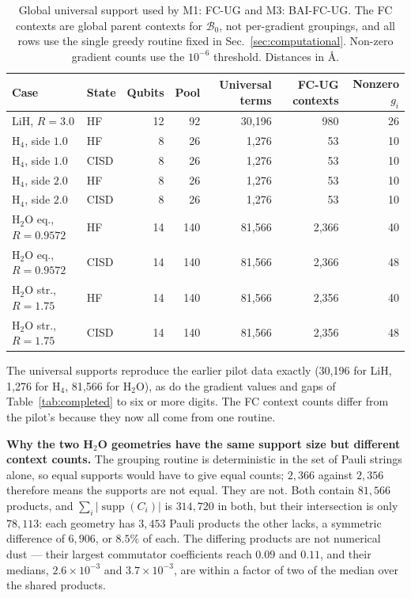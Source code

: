 \documentclass[10pt]{article}
\newcommand{\supp}{\operatorname{supp}}
\begin{document}
\begin{table}[!htbp]
\centering
\scriptsize
\caption{Global universal support used by M1: FC-UG and M3: BAI-FC-UG. The FC contexts are global parent contexts for $\mathcal B_0$, not per-gradient groupings, and all rows use the single greedy routine fixed in Sec.~\ref{sec:computational}. Non-zero gradient counts use the $10^{-6}$ threshold. Distances in \si{\angstrom}.}
\label{tab:structure}
\begin{tabular}{llrrrrr}
\toprule
Case & State & Qubits & Pool & Universal terms & FC-UG contexts & Nonzero $g_i$ \\
\midrule
LiH, $R{=}3.0$ & HF & 12 & 92 & 30,196 & 980 & 26 \\
H$_4$, side $1.0$ & HF & 8 & 26 & 1,276 & 53 & 10 \\
H$_4$, side $1.0$ & CISD & 8 & 26 & 1,276 & 53 & 10 \\
H$_4$, side $2.0$ & HF & 8 & 26 & 1,276 & 53 & 10 \\
H$_4$, side $2.0$ & CISD & 8 & 26 & 1,276 & 53 & 10 \\
H$_2$O eq., $R{=}0.9572$ & HF & 14 & 140 & 81,566 & 2,366 & 40 \\
H$_2$O eq., $R{=}0.9572$ & CISD & 14 & 140 & 81,566 & 2,366 & 48 \\
H$_2$O str., $R{=}1.75$ & HF & 14 & 140 & 81,566 & 2,356 & 40 \\
H$_2$O str., $R{=}1.75$ & CISD & 14 & 140 & 81,566 & 2,356 & 48 \\
\bottomrule
\end{tabular}
\end{table}

The universal supports reproduce the earlier pilot data exactly (30,196 for LiH, 1,276 for H$_4$, 81,566 for H$_2$O), as do the gradient values and gaps of Table~\ref{tab:completed} to six or more digits. The FC context counts differ from the pilot's because they now all come from one routine.

\textbf{Why the two H$_2$O geometries have the same support size but different context counts.} The grouping routine is deterministic in the set of Pauli strings alone, so equal supports would have to give equal counts; $2{,}366$ against $2{,}356$ therefore means the supports are not equal. They are not. Both contain $81{,}566$ products, and $\sum_i|\supp(C_i)|$ is $314{,}720$ in both, but their intersection is only $78{,}113$: each geometry has $3{,}453$ Pauli products the other lacks, a symmetric difference of $6{,}906$, or $8.5\%$ of each. The differing products are not numerical dust --- their largest commutator coefficients reach $0.09$ and $0.11$, and their medians, $2.6\times10^{-3}$ and $3.7\times10^{-3}$, are within a factor of two of the median over the shared products.
\end{document}

